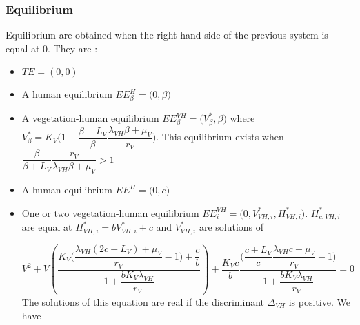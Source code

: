 \documentclass{article}
\newcommand{\lv}{\lambda_{VH}}
\begin{document}
\subsubsection{Equilibrium}
Equilibrium are obtained when the right hand side of the previous system is equal at 0. They are :
\begin{itemize}
\item $TE = (0,0)$
\item A human equilibrium $EE^H_\beta = \Big(0,\beta \Big)$
\item A vegetation-human equilibrium $EE^{VH}_\beta = \Big(V^*_{\beta}, \beta \Big)$ where $V^*_\beta = K_V \Big(1- \dfrac{\beta + L_V}{\beta} \dfrac{\lv \beta + \mu_V}{r_V} \Big)$. This equilibrium exists when $\dfrac{\beta}{\beta + L_V} \dfrac{r_V}{\lv \beta + \mu_V} > 1$
\item A human equilibrium $EE^H = \Big(0,c\Big)$
\item One or two vegetation-human equilibrium $EE^{VH}_i = \Big(0, V^*_{VH,i}, H^*_{VH,i} \Big)$. $H^*_{c, VH,i}$ are equal at $H^*_{VH, i} = bV^*_{VH, i} + c$ and $V^*_{VH,i}$ are solutions of
%
%

\begin{equation}
V^2 + V \left(\dfrac{K_V\Big(\dfrac{\lv(2c+L_V) + \mu_V}{r_V} - 1\Big) + \dfrac{c}{b}}{1 + \dfrac{b K_V \lv}{r_V}}  \right) + \dfrac{K_Vc}{b} \dfrac{\Big(\dfrac{c+L_V}{c} \dfrac{\lv c + \mu_V}{r_V} - 1\Big)}{1 + \dfrac{b K_V \lv}{r_V}} = 0
\label{equilibreVH:equationV}
\end{equation}
The solutions of this equation are real if the discriminant $\Delta_{VH}$ is positive. We have


\end{itemize}
\end{document}

